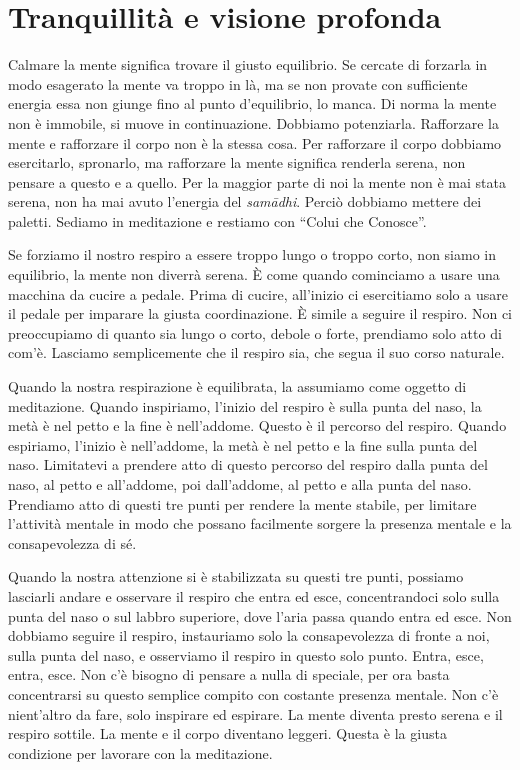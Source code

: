 \chapter{Tranquillità e visione profonda}

Calmare la mente significa trovare il giusto equilibrio. Se cercate di
forzarla in modo esagerato la mente va troppo in là, ma se non provate
con sufficiente energia essa non giunge fino al punto d'equilibrio, lo
manca. Di norma la mente non è immobile, si muove in continuazione.
Dobbiamo potenziarla. Rafforzare la mente e rafforzare il corpo non è la
stessa cosa. Per rafforzare il corpo dobbiamo esercitarlo, spronarlo, ma
rafforzare la mente significa renderla serena, non pensare a questo e a
quello. Per la maggior parte di noi la mente non è mai stata serena, non
ha mai avuto l'energia del \emph{samādhi}. Perciò dobbiamo mettere dei
paletti. Sediamo in meditazione e restiamo con ``Colui che Conosce''.

Se forziamo il nostro respiro a essere troppo lungo o troppo corto, non
siamo in equilibrio, la mente non diverrà serena. È come quando
cominciamo a usare una macchina da cucire a pedale. Prima di cucire,
all'inizio ci esercitiamo solo a usare il pedale per imparare la giusta
coordinazione. È simile a seguire il respiro. Non ci preoccupiamo di
quanto sia lungo o corto, debole o forte, prendiamo solo atto di com'è.
Lasciamo semplicemente che il respiro sia, che segua il suo corso
naturale.

Quando la nostra respirazione è equilibrata, la assumiamo come oggetto
di meditazione. Quando inspiriamo, l'inizio del respiro è sulla punta
del naso, la metà è nel petto e la fine è nell'addome. Questo è il
percorso del respiro. Quando espiriamo, l'inizio è nell'addome, la metà
è nel petto e la fine sulla punta del naso. Limitatevi a prendere atto
di questo percorso del respiro dalla punta del naso, al petto e
all'addome, poi dall'addome, al petto e alla punta del naso. Prendiamo
atto di questi tre punti per rendere la mente stabile, per limitare
l'attività mentale in modo che possano facilmente sorgere la presenza
mentale e la consapevolezza di sé.

Quando la nostra attenzione si è stabilizzata su questi tre punti,
possiamo lasciarli andare e osservare il respiro che entra ed esce,
concentrandoci solo sulla punta del naso o sul labbro superiore, dove
l'aria passa quando entra ed esce. Non dobbiamo seguire il respiro,
instauriamo solo la consapevolezza di fronte a noi, sulla punta del
naso, e osserviamo il respiro in questo solo punto. Entra, esce, entra,
esce. Non c'è bisogno di pensare a nulla di speciale, per ora basta
concentrarsi su questo semplice compito con costante presenza mentale.
Non c'è nient'altro da fare, solo inspirare ed espirare. La mente
diventa presto serena e il respiro sottile. La mente e il corpo
diventano leggeri. Questa è la giusta condizione per lavorare con la
meditazione.

